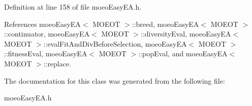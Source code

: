 Definition at line 158 of file moeo\-Easy\-EA.h.

References moeo\-Easy\-EA$<$ MOEOT $>$::breed, moeo\-Easy\-EA$<$ MOEOT $>$::continuator, moeo\-Easy\-EA$<$ MOEOT $>$::diversity\-Eval, moeo\-Easy\-EA$<$ MOEOT $>$::eval\-Fit\-And\-Div\-Before\-Selection, moeo\-Easy\-EA$<$ MOEOT $>$::fitness\-Eval, moeo\-Easy\-EA$<$ MOEOT $>$::pop\-Eval, and moeo\-Easy\-EA$<$ MOEOT $>$::replace.

The documentation for this class was generated from the following file:\begin{CompactItemize}
\item 
moeo\-Easy\-EA.h\end{CompactItemize}
